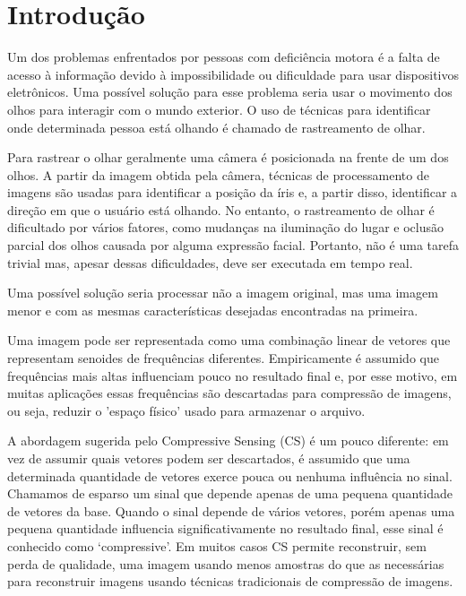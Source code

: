 \chapter{Introdução}

Um dos problemas enfrentados por pessoas com deficiência motora é a falta de acesso à informação devido à impossibilidade ou dificuldade para usar dispositivos eletrônicos. Uma possível solução para esse problema seria usar o movimento dos olhos para interagir com o mundo exterior. O uso de técnicas para identificar onde determinada pessoa está olhando é chamado de rastreamento de olhar.

Para rastrear o olhar geralmente uma câmera é posicionada na frente de um dos olhos. A partir da imagem obtida pela câmera, técnicas de processamento de imagens são usadas para identificar a posição da íris e, a partir disso, identificar a direção em que o usuário está olhando. No entanto, o rastreamento de olhar é dificultado por vários fatores, como mudanças na iluminação do lugar e oclusão parcial dos olhos causada por alguma expressão facial. Portanto, não é uma tarefa trivial mas, apesar dessas dificuldades, deve ser executada em tempo real.

Uma possível solução seria processar não a imagem original, mas uma imagem menor e com as mesmas características desejadas encontradas na primeira.

Uma imagem pode ser representada como uma combinação linear de vetores que representam senoides de frequências diferentes. Empiricamente é assumido que frequências mais altas influenciam pouco no resultado final e, por esse motivo, em muitas aplicações essas frequências são descartadas para compressão de imagens, ou seja, reduzir o 'espaço físico' usado para armazenar o arquivo.

A abordagem sugerida pelo Compressive Sensing (CS) é um pouco diferente: em vez de assumir quais vetores podem ser descartados, é assumido que uma determinada quantidade de vetores exerce pouca ou nenhuma influência no sinal. Chamamos de esparso um sinal que depende apenas de uma pequena quantidade de vetores da base. Quando o sinal depende de vários vetores, porém apenas uma pequena quantidade influencia significativamente no resultado final, esse sinal é conhecido como `compressive'. Em muitos casos CS permite reconstruir, sem perda de qualidade, uma imagem usando menos amostras do que as necessárias para reconstruir imagens usando técnicas tradicionais de compressão de imagens.